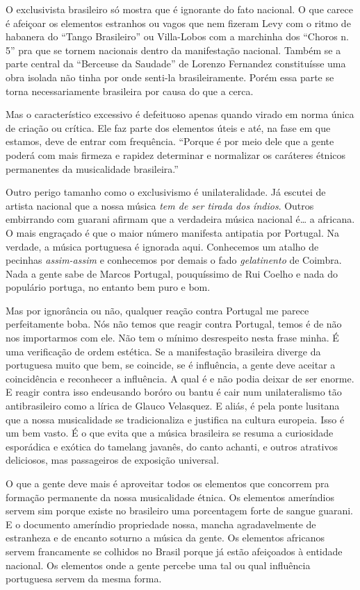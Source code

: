 O exclusivista brasileiro só mostra que é ignorante do fato nacional. O
que carece é afeiçoar os elementos estranhos ou vagos que nem fizeram
Levy com o ritmo de habanera do ``Tango Brasileiro'' ou Villa-Lobos com a
marchinha dos ``Choros n.\,5'' pra que se tornem nacionais dentro da
manifestação nacional. Também se a parte central da ``Berceuse da
Saudade'' de Lorenzo Fernandez constituísse uma
obra isolada não tinha por onde senti-la brasileiramente. Porém essa
parte se torna necessariamente brasileira por causa do que a cerca.

Mas o característico excessivo é defeituoso apenas quando virado em
norma única de criação ou crítica. Ele faz parte dos elementos úteis e
até, na fase em que estamos, deve de entrar com frequência. ``Porque
é por meio dele que a gente poderá com mais firmeza e rapidez determinar
e normalizar os caráteres étnicos permanentes da musicalidade
brasileira.''

Outro perigo tamanho como o exclusivismo é unilateralidade. Já escutei
de artista nacional que a nossa música \textit{tem de ser tirada dos
índios}. Outros embirrando com guarani afirmam que a verdadeira música
nacional é\ldots{} a africana. O mais engraçado é que o maior número
manifesta antipatia por Portugal. Na verdade, a música portuguesa é
ignorada aqui. Conhecemos um atalho de pecinhas \textit{assim-assim} e conhecemos
por demais o fado \textit{gelatinento} de Coimbra. Nada a gente sabe de Marcos
Portugal, pouquíssimo de Rui Coelho e nada do populário portuga, no
entanto bem puro e bom.

Mas por ignorância ou não, qualquer reação contra Portugal me parece
perfeitamente boba. Nós não temos que reagir contra Portugal, temos é de
não nos importarmos com ele. Não tem o mínimo desrespeito nesta frase
minha. É uma verificação de ordem estética. Se a manifestação brasileira
diverge da portuguesa muito que bem, se coincide, se é influência, a
gente deve aceitar a coincidência e reconhecer a influência. A qual é e
não podia deixar de ser enorme. E reagir contra isso endeusando boróro
ou bantu é cair num unilateralismo tão antibrasileiro como a lírica de
Glauco Velasquez. E aliás, é pela ponte lusitana que a nossa
musicalidade se tradicionaliza e justifica na cultura europeia. Isso é
um bem vasto. É o que evita que a música brasileira se resuma a
curiosidade esporádica e exótica do tamelang javanês, do canto achanti,
e outros atrativos deliciosos, mas passageiros de exposição universal.

O que a gente deve mais é aproveitar todos os elementos que concorrem pra
formação permanente da nossa musicalidade étnica. Os elementos
ameríndios servem sim porque existe no brasileiro uma porcentagem forte
de sangue guarani. E o documento ameríndio propriedade nossa, mancha
agradavelmente de estranheza e de encanto soturno a música da gente. Os
elementos africanos servem francamente se colhidos no Brasil porque já
estão afeiçoados à entidade nacional. Os elementos onde a gente percebe
uma tal ou qual influência portuguesa servem da mesma forma.

